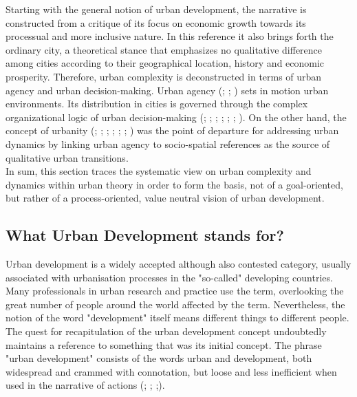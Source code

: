 \documentclass[11pt]{report}
\begin{document}
{{Starting with the general notion of urban development, the narrative is constructed from a critique   of its focus on economic growth towards its processual and more inclusive nature. In this reference it also brings forth the ordinary city, a theoretical stance that emphasizes no qualitative difference among cities according to their geographical location, history and economic prosperity. Therefore, urban complexity is deconstructed in terms of urban agency and urban decision-making. Urban agency (\href{Healey}{\citealt{healey_institutional_1992}}; \href{ref}{\citealt{mcfarlane_assemblage_2011}}; \href{ref}{\citealt{delanda_new_2013}}) sets in motion urban environments.
Its distribution in cities is governed through the complex organizational logic of urban decision-making (\href{ref}{\citealt{putnam_what_1993}}; \href{ref}{\citealt{hall_political_1996}}; \href{ref}{\citealt{healey_collaborative_1997}}; \href{ref}{\citealt{scott_seeing_1998}}; \href{ref}{\citealt{pierre_debating_2000}}; \href{ref}{\citealt{pierre_governance_2000}}; \href{ref}{\citealt{hudson_political_2014}}).
On the other hand, the concept of urbanity (\href{ref}{\citealt{haussermann_urbanitet:_1992}}; \href{ref}{\citealt{gronlund_notions_2007}}; \href{ref}{\citealt{marcus_spatial_2007}}; \href{ref}{\citealt{zijderveld_theory_2011}}; \href{ref}{\citealt{canuto_establishing_2012}}; \href{ref}{\citealt{de_aguiar_douglas_vieira_what_2013}}; \href{ref}{\citealt{holden_justifying_2015}}) was the point of departure for addressing urban dynamics by linking urban agency to socio-spatial references as the source of qualitative urban transitions.
\\

In sum, this section traces the systematic view on urban complexity and dynamics within urban theory in order to form the basis, not of a goal-oriented, but rather of a process-oriented, value neutral vision of urban development.

\subsection{What Urban Development stands for?}

Urban development is a widely accepted although also contested category, usually associated with urbanisation processes in the "so-called" developing countries. Many professionals in urban research and practice use the term, overlooking the great number of people around the world affected by the term.   Nevertheless, the notion of the word "development" itself means different things to different people.
The quest for recapitulation of the urban development concept undoubtedly maintains a reference to something that was its initial concept. The phrase "urban development" consists of the words urban and development, both widespread and crammed with connotation, but loose and less inefficient when used in the narrative of actions (\href{Bolay}{\citealt{bolay_slums_2006}}; \href{Bolay}{\citealt{bolay_changements_2010}}; \href{Bolay}{\citealt{bolay_what_2012}};\href{Bolay}{\citealt{bolay_technology_2011}}).
\\

}}
\end{document}
